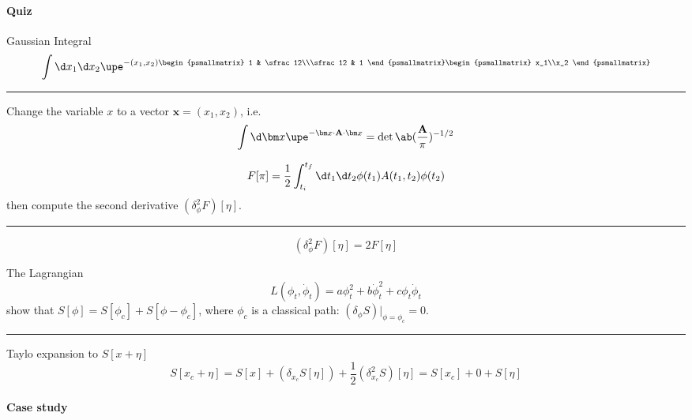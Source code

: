 \paragraph{Quiz}

\begin{problem}
  Gaussian Integral
  \[
    \int \d x_1 \d x_2 \upe^{-(x_1,x_2) \begin{psmallmatrix}
      1 & \sfrac12\\\sfrac12 & 1
    \end{psmallmatrix} \begin{psmallmatrix}
      x_1\\x_2
    \end{psmallmatrix}}
  \]
  \rule{\linewidth}{1pt}
  Change the variable $x$ to a vector $\bm x = (x_1, x_2)$, i.e.
  \[
    \int \d\bm x \upe^{-\bm x \cdot \mathbf A \cdot \bm x}
  = \det\ab(\frac{\mathbf A}{\pi})^{-1/2}
  \]
\end{problem}

\begin{problem}
  \[
    F[\pi] = \frac12 \int_{t_i}^{t_f} \d t_1 \d t_2 \phi(t_1) A(t_1,t_2) \phi(t_2)
  \]
  then compute the second derivative $(\delta_\phi^2F)[\eta]$.\\
  \rule{\linewidth}{1pt}
  \[
    (\delta_\phi^2F)[\eta] = 2F[\eta]
  \]
\end{problem}

\begin{problem}
  The Lagrangian
  \[
    L(\phi_t, \dot\phi_t) = a\phi_t^2 + b\dot\phi_t^2 + c\phi_t\dot\phi_t
  \]
  show that $S[\phi] = S[\phi_c] + S[\phi - \phi_c]$,
  where $\phi_c$ is a classical path: $(\delta_\phi S)\big|_{\phi=\phi_c} = 0$.\\
  \rule{\linewidth}{1pt}
  Taylo expansion to $S[x + \eta]$
  \[
    S[x_c + \eta] = S[x] + (\delta_{x_c} S[\eta]) + \frac12(\delta_{x_c}^2S)[\eta]
  = S[x_c] + 0 + S[\eta]
  \]
\end{problem}

\paragraph{Case study}

